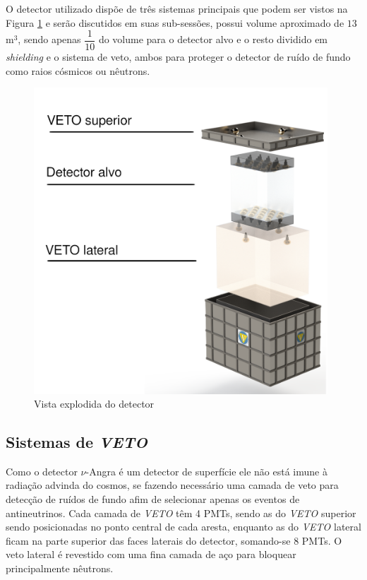 O detector utilizado dispõe de três sistemas principais que podem ser vistos na Figura \ref{fig:detector} e serão discutidos em suas sub-sessões, possui volume aproximado de $13$ m$^3$, sendo apenas $\dfrac{1}{10}$ do volume para o detector alvo e o resto dividido em \emph{shielding} e o sistema de veto, ambos para proteger o detector de ruído de fundo como raios cósmicos ou nêutrons.

\begin{figure}[H]
    \centering
    \includegraphics[width=11cm]{textuais/experimento/figuras/detector.png}
    \caption{Vista explodida do detector}
    \label{fig:detector}
\end{figure}

\subsection{Sistemas de \emph{VETO}}

Como o detector $\nu$-Angra é um detector de superfície ele não está imune à radiação advinda do cosmos, se fazendo necessário uma camada de veto para detecção de ruídos de fundo afim de selecionar apenas os eventos de antineutrinos. Cada camada de \emph{VETO} têm 4 PMTs, sendo as do \emph{VETO} superior sendo posicionadas no ponto central de cada aresta, enquanto as do \emph{VETO} lateral ficam na parte superior das faces laterais do detector, somando-se 8 PMTs. O veto lateral é revestido com uma fina camada de aço para bloquear principalmente nêutrons.\cite{dion2019}

